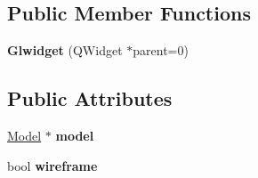 \subsection*{Public Member Functions}
\begin{DoxyCompactItemize}
\item 
\mbox{\label{class_glwidget_a498977aa216afadd4adba780063356ac}} 
{\bfseries Glwidget} (Q\+Widget $\ast$parent=0)
\end{DoxyCompactItemize}
\subsection*{Public Attributes}
\begin{DoxyCompactItemize}
\item 
\mbox{\label{class_glwidget_a160da762ff1b4a6c1bf6f09bfb71e15c}} 
\mbox{\hyperlink{class_model}{Model}} $\ast$ {\bfseries model}
\item 
\mbox{\label{class_glwidget_abe8b6e5adc693200d652414fd8929f46}} 
bool {\bfseries wireframe}
\end{DoxyCompactItemize}
